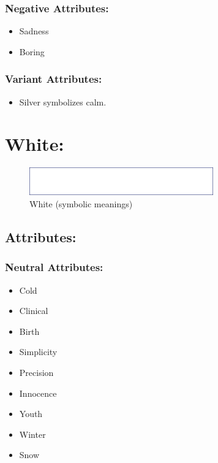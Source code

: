 \documentclass[openleft,oneside,showtrims]{memoir}
\begin{document}
\subsubsection*{Negative Attributes:}
\label{sec:org6418af6}

\begin{itemize}
\item Sadness
\item Boring
\end{itemize}

\subsubsection*{Variant Attributes:}
\label{sec:org20436e5}

\begin{itemize}
\item Silver symbolizes calm.
\end{itemize}

\section{White:}
\label{sec:orga422f16}

\begin{figure}[htbp]
\centering
\includegraphics[width=300px]{./media/white-banner.png}
\caption{\label{fig:HAP-WR-014}White (symbolic meanings)}
\end{figure}

\subsection{Attributes:}
\label{sec:org466e70e}

\subsubsection*{Neutral Attributes:}
\label{sec:org211866b}

\begin{itemize}
\item Cold
\item Clinical
\item Birth
\item Simplicity
\item Precision
\item Innocence
\item Youth
\item Winter
\item Snow
\end{itemize}
\end{document}
